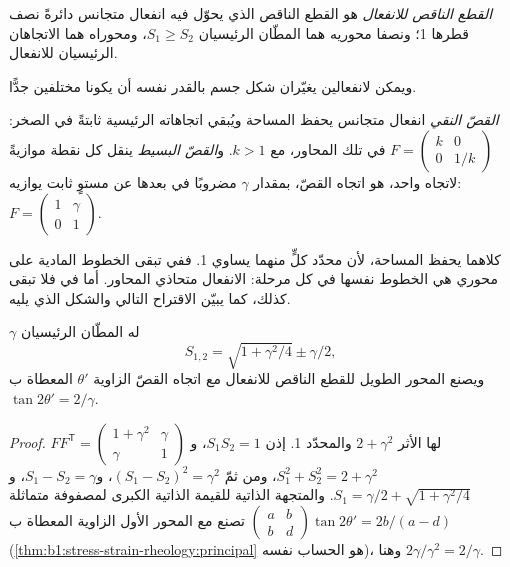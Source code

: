 \begin{definition}\label{def:b1:stress-strain-rheology:strain-ellipse}
\emph{القطع الناقص للانفعال} هو القطع الناقص الذي يحوّل فيه انفعال متجانس دائرةً نصف قطرها 1؛ ونصفا محوريه هما المطّان الرئيسيان $S_1 \ge S_2$، ومحوراه هما الاتجاهان الرئيسيان للانفعال.
\end{definition}

ويمكن لانفعالين يغيّران شكل جسم بالقدر نفسه أن يكونا مختلفين جدًّا.

\begin{definition}\label{def:b1:stress-strain-rheology:shear-types}
\emph{القصّ النقي} انفعال متجانس يحفظ المساحة ويُبقي اتجاهاته الرئيسية ثابتةً في الصخر: $F = \begin{pmatrix} k & 0 \\ 0 & 1/k\end{pmatrix}$ في تلك المحاور، مع $k > 1$. و\emph{القصّ البسيط} ينقل كل نقطة موازيةً لاتجاه واحد، هو اتجاه القصّ، بمقدار $\gamma$ مضروبًا في بعدها عن مستوٍ ثابت يوازيه: $F = \begin{pmatrix} 1 & \gamma \\ 0 & 1\end{pmatrix}$.
\end{definition}

كلاهما يحفظ المساحة، لأن محدّد كلٍّ منهما يساوي 1. ففي  تبقى الخطوط المادية على محوري  هي الخطوط نفسها في كل مرحلة: الانفعال متحاذي المحاور. أما في  فلا تبقى كذلك، كما يبيّن الاقتراح التالي والشكل الذي يليه.

\begin{proposition}\label{prop:b1:stress-strain-rheology:simple-shear}
 $\gamma$ له المطّان الرئيسيان
\[
  S_{1,2} = \sqrt{1 + \gamma^2/4} \pm \gamma/2 ,
\]
ويصنع المحور الطويل للقطع الناقص للانفعال مع اتجاه القصّ الزاوية $\theta'$ المعطاة ب$\tan2\theta' = 2/\gamma$.
\end{proposition}

\begin{proof}
$FF^{\mathsf T} = \begin{pmatrix} 1+\gamma^2 & \gamma \\ \gamma & 1\end{pmatrix}$
لها الأثر $2+\gamma^2$ والمحدّد 1. إذن $S_1S_2 = 1$، و$S_1^2 + S_2^2 = 2 + \gamma^2$، ومن ثمّ $(S_1 - S_2)^2 = \gamma^2$، و$S_1 - S_2 = \gamma$، و$S_1 = \gamma/2 + \sqrt{1+\gamma^2/4}$. والمتجهة الذاتية للقيمة الذاتية الكبرى لمصفوفة متماثلة $\begin{pmatrix} a & b \\ b & d\end{pmatrix}$ تصنع مع المحور الأول الزاوية المعطاة ب$\tan2\theta' = 2b/(a-d)$ (\cref{thm:b1:stress-strain-rheology:principal} هو الحساب نفسه)، وهنا $2\gamma/\gamma^2 = 2/\gamma$.
\end{proof}

